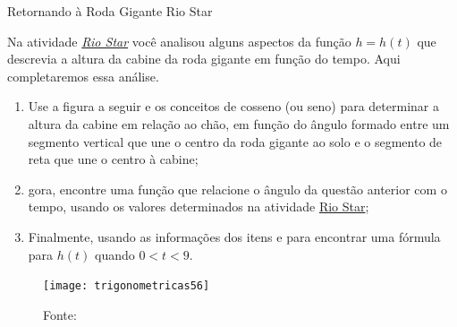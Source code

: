 \begin{task}{Retornando à Roda Gigante Rio Star}
\label{trig-ativ15}

Na atividade \hyperref[trig-ativ4]{\textit{Rio Star}}  você analisou alguns aspectos da função $h = h(t)$ que descrevia a altura da cabine da roda gigante em função do tempo. Aqui completaremos essa análise.
\begin{enumerate}
\item Use a figura a seguir e os conceitos de cosseno (ou seno) para determinar a altura da cabine em relação ao chão, em função do ângulo formado entre um segmento vertical que une o centro da roda gigante ao solo e o segmento de reta que une o centro à cabine;
\item gora, encontre uma função que relacione o ângulo da questão anterior com o tempo, usando os valores determinados na atividade \hyperref[trig-ativ4]{Rio Star};
\item Finalmente, usando as informações dos itens  e  para encontrar uma fórmula para $h(t)$ quando $0 < t < 9$.
\end{enumerate}

\begin{figure}[H]
\centering

\texttt{[image: trigonometricas56]}
\caption{Fonte: \cite{soares2010}}
\label{}
\end{figure}
\end{task}

